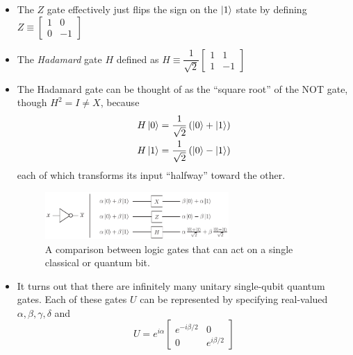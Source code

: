 \documentclass{article}
\begin{document}
\begin{itemize}
                \item The $Z$ gate effectively just flips the sign on the $\ket{1}$ state by defining $Z \equiv \begin{bmatrix}
                    1 & 0 \\
                    0 & -1
                \end{bmatrix}$
                \item The \emph{Hadamard} gate $H$ defined as $H \equiv \dfrac{1}{\sqrt{2}} \begin{bmatrix}
                    1 & 1 \\
                    1 & -1
                \end{bmatrix}$
                \item The Hadamard gate can be thought of as the ``square root'' of the NOT gate, though $H^2 = I \neq X$, because 
                \begin{align}
                    H \ket{0} = \frac{1}{\sqrt{2}} \left(\ket{0} + \ket{1}\right) \\
                    H \ket{1} = \frac{1}{\sqrt{2}} \left(\ket{0} - \ket{1}\right)
                \end{align}
                each of which transforms its input ``halfway'' toward the other.
                \begin{figure}[h]
                    \centering
                    \includegraphics[width=0.66\textwidth]{images/single_circuits.png}
                    \caption{A comparison between logic gates that can act on a single classical or quantum bit.}
                \end{figure}
                \item It turns out that there are infinitely many unitary single-qubit quantum gates.  Each of these gates $U$ can be represented by specifying real-valued $\alpha, \beta, \gamma, \delta$ and 
                \begin{equation}
                    U = e^{i \alpha} 
                    \begin{bmatrix}
                        e^{-i \beta /2} & 0 \\
                        0               & e^{i \beta / 2}
                    \end{bmatrix} 

\end{equation}
\end{itemize}
\end{document}
